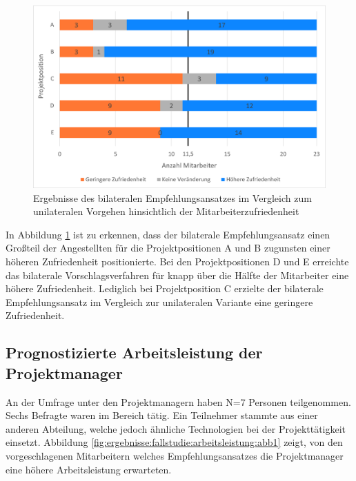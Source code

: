 \begin{figure}[h]
	\centering
	\includegraphics[width=1\textwidth]{gfx/zufriedenheit-projekte.png}	
	\caption{Ergebnisse des bilateralen Empfehlungsansatzes im Vergleich zum unilateralen Vorgehen hinsichtlich der Mitarbeiterzufriedenheit}
	\label{fig:ergebnisse:analyse:abb7}
\end{figure}
In Abbildung \ref{fig:ergebnisse:analyse:abb7} ist zu erkennen, dass der bilaterale Empfehlungsansatz einen Großteil der Angestellten für die Projektpositionen A und B zugunsten einer höheren Zufriedenheit positionierte. Bei den Projektpositionen D und E erreichte das bilaterale Vorschlagsverfahren für knapp über die Hälfte der Mitarbeiter eine höhere Zufriedenheit. Lediglich bei Projektposition C erzielte der bilaterale Empfehlungsansatz im Vergleich zur unilateralen Variante eine geringere Zufriedenheit.
\newpage
\subsection{Prognostizierte Arbeitsleistung der Projektmanager}
\label{ch:ergebnisse:fallstudie:arbeitsleistung}
An der Umfrage unter den Projektmanagern haben N=7 Personen teilgenommen. Sechs Befragte waren im Bereich \JES tätig. Ein Teilnehmer stammte aus einer anderen Abteilung, welche jedoch ähnliche Technologien bei der Projekttätigkeit einsetzt. Abbildung \ref{fig:ergebnisse:fallstudie:arbeitsleistung:abb1} zeigt, von den vorgeschlagenen Mitarbeitern welches Empfehlungsansatzes die Projektmanager eine höhere Arbeitsleistung erwarteten.

